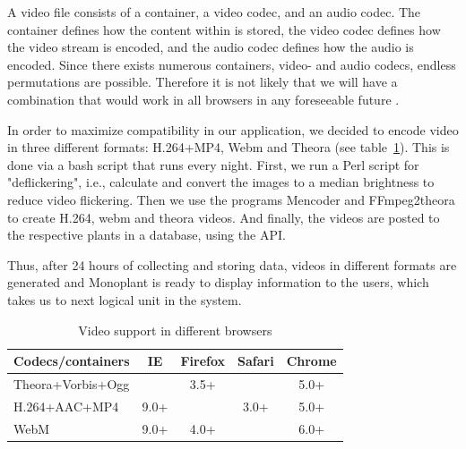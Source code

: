 A video file consists of a container, a video codec, and an audio codec. The container defines how the content within is stored, the video codec defines how the video stream is encoded, and the audio codec defines how the audio is encoded. Since there exists numerous containers, video- and audio codecs, endless permutations are possible. Therefore it is not likely that we will have a combination that would work in all browsers in any foreseeable future \citep{pilgrim2010html5}.

In order to maximize compatibility in our application, we decided to encode video in three different formats: H.264+MP4, Webm and Theora (see table~\ref{tab:videosupport}). This is done via a bash script that runs every night. First, we run a Perl script for "deflickering", i.e., calculate and convert the images to a median brightness to reduce video flickering. Then we use the programs Mencoder and FFmpeg2theora to create H.264, webm and theora videos. And finally, the videos are posted to the respective plants in a database, using the API. 

Thus, after 24 hours of collecting and storing data, videos in different formats are generated and Monoplant is ready to display information to the users, which takes us to next logical unit in the system.

\begin{table}\centering
\begin{tabular}{@{}lcccc@{}} \toprule
Codecs/containers & IE & Firefox & Safari & Chrome \\ \midrule
Theora+Vorbis+Ogg & ~                 & 3.5+    & ~      & 5.0+   \\ 
H.264+AAC+MP4     & 9.0+              & ~       & 3.0+   & 5.0+   \\ 
WebM              & 9.0+              & 4.0+    & ~      & 6.0+   \\ \bottomrule
\end{tabular}
\caption{Video support in different browsers \citep{pilgrim2010html5}}
\label{tab:videosupport}
\end{table}


